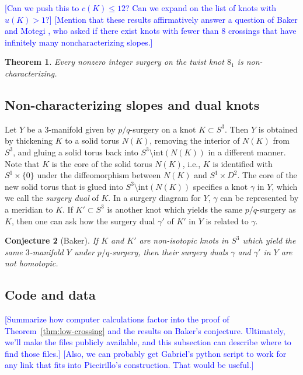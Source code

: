 \documentclass[11pt,usenames,dvipsnames,reqno]{amsart}
\newtheorem{theorem}{Theorem}
\numberwithin{theorem}{section}
\newtheorem{conjecture}[theorem]{Conjecture}
\theoremstyle{ex}
\theoremstyle{rem}
\def\kh#1{\textcolor{Blue}{#1}}
\begin{document}
\kh{[Can we push this to $c(K)\leq 12$? Can we expand on the list of knots with $u(K)>1$?]} 
\kh{[Mention that these results affirmatively answer a question of Baker and Motegi \cite[Question~1.7]{baker-motegi}, who asked if there exist knots with fewer than 8 crossings that have infinitely many noncharacterizing slopes.]}


\begin{theorem}
Every nonzero integer surgery on the twist knot $8_1$ is non-characterizing.
\end{theorem}



\subsection{Non-characterizing slopes and dual knots} Let $Y$ be a 3-manifold given by $p/q$-surgery on a knot $K\subset S^3$. Then $Y$ is obtained by thickening $K$ to a solid torus $N(K)$, removing the interior of $N(K)$ from $S^3$, and gluing a solid torus back into $S^3\setminus\mathrm{int}(N(K))$ in a different manner. Note that $K$ is the core of the solid torus $N(K)$, i.e., $K$ is identified with $S^1\times\{0\}$ under the diffeomorphism between $N(K)$ and $S^1\times D^2$. The core of the new solid torus that is glued into $S^3\setminus\mathrm{int}(N(K))$ specifies a knot $\gamma$ in $Y$, which we call the \textit{surgery dual} of $K$. In a surgery diagram for $Y$, $\gamma$ can be represented by a meridian to $K$. If $K'\subset S^3$ is another knot which yields the same $p/q$-surgery as $K$, then one can ask how the surgery dual $\gamma'$ of $K'$ in $Y$ is related to $\gamma$. 

\begin{conjecture}[Baker] If $K$ and $K'$ are non-isotopic knots in $S^3$ which yield the same $3$-manifold $Y$ under $p/q$-surgery, then their surgery duals $\gamma$ and $\gamma'$ in $Y$ are not homotopic.
\end{conjecture}

\subsection{Code and data} \kh{[Summarize how computer calculations factor into the proof of Theorem~\ref{thm:low-crossing} and the results on Baker's conjecture. Ultimately, we'll make the files publicly available, and this subsection can describe where to find those files.]} \kh{[Also, we can probably get Gabriel's python script to work for any link that fits into Piccirillo's construction. That would be useful.]}
\end{document}
